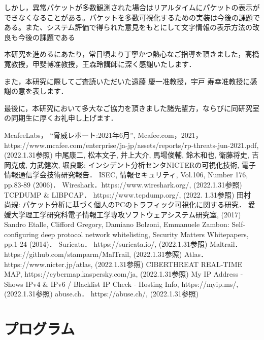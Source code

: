 \documentclass{thesis}
\begin{document}
しかし，異常パケットが多数観測された場合はリアルタイムにパケットの表示ができなくなることがある。パケットを多数可視化するための実装は今後の課題である。また、システム評価で得られた意見をもとにして文字情報の表示方法の改良も今後の課題である

\acknowledgement

本研究を進めるにあたり，常日頃より丁寧かつ熱心なご指導を頂きました，高橋寛教授，甲斐博准教授，王森玲講師に深く感謝いたします．

また，本研究に際してご査読いただいた遠藤 慶一准教授，宇戸 寿幸准教授に感謝の意を表します．

最後に，本研究において多大なご協力を頂きました諸先輩方，ならびに同研究室の同期生に厚くお礼申し上げます．

\begin{thebibliography}{99}
McafeeLabs，
``脅威レポート:2021年6月'',
Mcafee.com，2021， 
https://www.mcafee.com/enterprise/ja-jp/assets/reports/rp-threats-jun-2021.pdf, (2022.1.31参照)
%
中尾康二, 松本文子, 井上大介, 馬場俊輔, 鈴木和也, 衛藤将史, 吉岡克成,
力武健次, 堀良彰: インシデント分析センタNICTERの可視化技術,
電子情報通信学会技術研究報告． ISEC, 情報セキュリティ,
Vol.106, Number 176, pp.83-89 (2006)．
%
Wireshark．https://www.wireshark.org/, (2022.1.31参照)
%
TCPDUMP \& LIBPCAP． https://www.tcpdump.org/, (2022. 1.31参照)
%
田村 尚規: パケット分析に基づく個人のPCのトラフィック可視化に関する研究． 愛媛大学理工学研究科電子情報工学専攻ソフトウェアシステム研究室, (2017)
%
Sandro Etalle, Clifford Gregory, Damiano Bolzoni, Emmanuele Zambon:
Self-configuring deep protocol network whitelisting,
Security Matters Whitepapers,  pp.1-24 (2014)．
%
Suricata． https://suricata.io/, (2022.1.31参照)
%
Maltrail． https://github.com/stamparm/MalTrail, (2022.1.31参照)
%
Atlas． https://www.nicter.jp/atlas, (2022.1.31参照)
%
CIBERTHREAT REAL-TIME MAP, https://cybermap.kaspersky.com/ja, (2022.1.31参照)
%
My IP Address - Shows IPv4 \& IPv6 / Blacklist IP Check - Hosting Info, https://myip.ms/, (2022.1.31参照)
%
abuse.ch． https://abuse.ch/, (2022.1.31参照)
%
\end{thebibliography}

\appendix

\chapter{プログラム}
\end{document}
